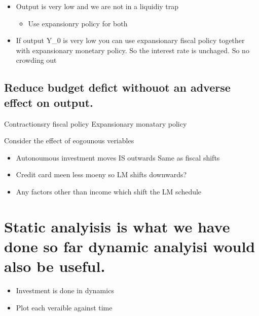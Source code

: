 \documentclass[twocolumn]{article}
\providecommand{\tightlist}{%
  \setlength{\itemsep}{0pt}\setlength{\parskip}{0pt}}
\begin{document}
\begin{itemize}
\tightlist
\item
  Output is very low and we are not in a liquidiy trap

  \begin{itemize}
  \tightlist
  \item
    Use expansionry policy for both
  \end{itemize}
\item
  If output Y\_0 is very low you can use expansionary fiscal policy
  together with expansionary monetary policy. So the interest rate is
  unchaged. So no crowding out
\end{itemize}

\hypertarget{reduce-budget-defict-withouot-an-adverse-effect-on-output.}{%
\subsection{Reduce budget defict withouot an adverse effect on
output.}\label{reduce-budget-defict-withouot-an-adverse-effect-on-output.}}

Contractionsry fiscal policy Expansionary monatary policy

Consider the effect of eogounous veriables

\begin{itemize}
\tightlist
\item
  Autonoumous investment moves IS outwards Same as fiscal shifts
\item
  Credit card meen less moeny so LM shifts downwards?
\item
  Any factors other than income which shift the LM schedule
\end{itemize}

\hypertarget{static-analyisis-is-what-we-have-done-so-far-dynamic-analyisi-would-also-be-useful.}{%
\section{Static analyisis is what we have done so far dynamic analyisi
would also be
useful.}\label{static-analyisis-is-what-we-have-done-so-far-dynamic-analyisi-would-also-be-useful.}}

\begin{itemize}
\tightlist
\item
  Investment is done in dynamics
\item
  Plot each veraible against time
\end{itemize}
\end{document}
